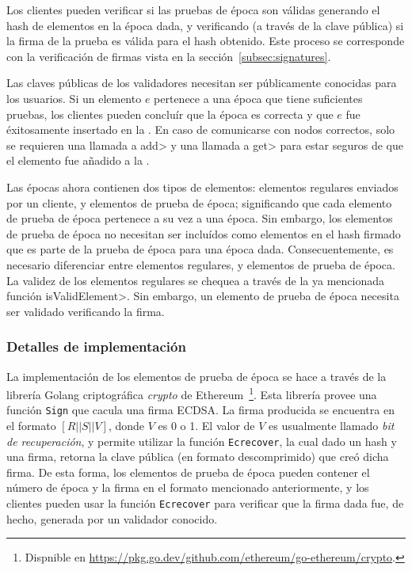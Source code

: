 Los clientes pueden verificar si las pruebas de época son válidas generando el hash de elementos
en la época dada, y verificando (a través de la clave pública) si la firma de la prueba es válida
para el hash obtenido. Este proceso se corresponde con la verificación de firmas vista en la
sección~\ref{subsec:signatures}.

%
Las claves públicas de los validadores necesitan ser públicamente conocidas para los usuarios.
%
Si un elemento $e$ pertenece a una época que tiene suficientes pruebas, los clientes pueden
concluír que la época es correcta y que $e$ fue éxitosamente insertado en la \setchain.
%
En caso de comunicarse con nodos correctos, solo se requieren una llamada a \<add> y
una llamada a \<get> para estar seguros de que el elemento fue añadido a la \setchain.
%

Las épocas ahora contienen dos tipos de elementos: elementos regulares enviados por
un cliente, y elementos de prueba de época; significando que cada elemento de prueba de época
pertenece a su vez a una época. Sin embargo, los elementos de prueba de época no necesitan ser
incluídos como elementos en el hash firmado que es parte de la prueba de época para una época
dada.
%
Consecuentemente, es necesario diferenciar entre elementos regulares, y elementos de prueba de época.
%
La validez de los elementos regulares se chequea a través de la ya mencionada función
\<isValidElement>.
%
Sin embargo, un elemento de prueba de época necesita ser validado verificando la firma.
%

\subsubsection{Detalles de implementación}

La implementación de los elementos de prueba de época se hace a través de la librería
Golang criptográfica \textit{crypto} de Ethereum~\footnote{Dispnible en \url{https://pkg.go.dev/github.com/ethereum/go-ethereum/crypto}.}.
%
Esta librería provee una función \texttt{Sign} que cacula una firma ECDSA.
%
La firma producida se encuentra en el formato $[R || S || V]$, donde $V$ es 0 o 1.
%
El valor de $V$ es usualmente llamado \textit{bit de recuperación}, y permite utilizar
la función \texttt{Ecrecover}, la cual dado un hash y una firma, retorna la clave pública
(en formato descomprimido) que creó dicha firma.
%
De esta forma, los elementos de prueba de época pueden contener el número de época y la firma
en el formato mencionado anteriormente, y los clientes pueden usar la función \texttt{Ecrecover} para
verificar que la firma dada fue, de hecho, generada por un validador conocido.
%

